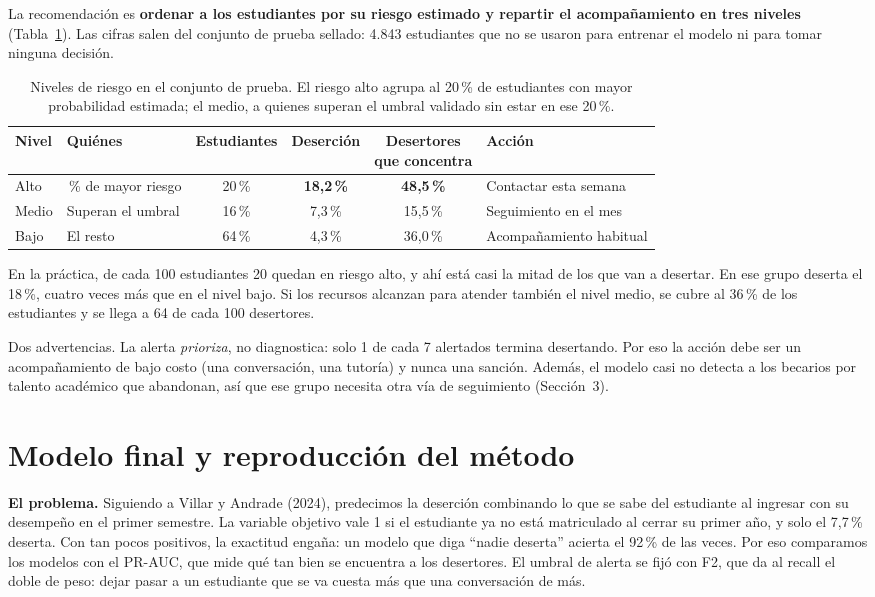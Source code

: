 \documentclass[11pt,a4paper]{article}
\begin{document}
La recomendación es \textbf{ordenar a los estudiantes por su riesgo estimado y repartir el acompañamiento en tres niveles} (Tabla~\ref{tab:niveles}). Las cifras salen del conjunto de prueba sellado: 4.843 estudiantes que no se usaron para entrenar el modelo ni para tomar ninguna decisión.

\begin{table}[H]
\centering
\small
\caption{Niveles de riesgo en el conjunto de prueba. El riesgo alto agrupa al 20\,\% de estudiantes con mayor probabilidad estimada; el medio, a quienes superan el umbral validado sin estar en ese 20\,\%.}
\label{tab:niveles}
\begin{tabular}{l>{\raggedright\arraybackslash}p{2.2cm}ccc>{\raggedright\arraybackslash}p{2.9cm}}
\toprule
Nivel & Quiénes & Estudiantes & Deserción & \shortstack{Desertores\\que concentra} & Acción \\
\midrule
Alto & 20\,\% de mayor riesgo & 20\,\% & \textbf{18,2\,\%} & \textbf{48,5\,\%} & Contactar esta semana \\
Medio & Superan el umbral & 16\,\% & 7,3\,\% & 15,5\,\% & Seguimiento en el mes \\
Bajo & El resto & 64\,\% & 4,3\,\% & 36,0\,\% & Acompañamiento habitual \\
\bottomrule
\end{tabular}
\end{table}

En la práctica, de cada 100 estudiantes 20 quedan en riesgo alto, y ahí está casi la mitad de los que van a desertar. En ese grupo deserta el 18\,\%, cuatro veces más que en el nivel bajo. Si los recursos alcanzan para atender también el nivel medio, se cubre al 36\,\% de los estudiantes y se llega a 64 de cada 100 desertores.

Dos advertencias. La alerta \emph{prioriza}, no diagnostica: solo 1 de cada 7 alertados termina desertando. Por eso la acción debe ser un acompañamiento de bajo costo (una conversación, una tutoría) y nunca una sanción. Además, el modelo casi no detecta a los becarios por talento académico que abandonan, así que ese grupo necesita otra vía de seguimiento (Sección~3).

\section{Modelo final y reproducción del método}

\textbf{El problema.} Siguiendo a Villar y Andrade (2024), predecimos la deserción combinando lo que se sabe del estudiante al ingresar con su desempeño en el primer semestre. La variable objetivo vale 1 si el estudiante ya no está matriculado al cerrar su primer año, y solo el 7,7\,\% deserta. Con tan pocos positivos, la exactitud engaña: un modelo que diga ``nadie deserta'' acierta el 92\,\% de las veces. Por eso comparamos los modelos con el PR-AUC, que mide qué tan bien se encuentra a los desertores. El umbral de alerta se fijó con F2, que da al recall el doble de peso: dejar pasar a un estudiante que se va cuesta más que una conversación de más.
\end{document}
